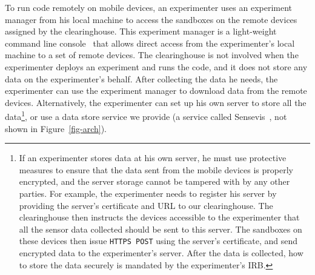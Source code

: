 To run code remotely on mobile devices, an experimenter uses an
experiment manager from his local machine 
to access the sandboxes on the remote devices assigned by the clearinghouse. 
This experiment manager is a light-weight command line 
console~\cite{demo-kit} that allows direct access from the 
experimenter's local machine to a set of remote devices. 
The clearinghouse is not involved when the experimenter deploys 
an experiment and runs the code, and it does not store any
data on the experimenter's behalf. After collecting the data he needs, the
experimenter can use the experiment manager to download data from the remote devices. 
Alternatively, the experimenter can set up his own server to store all 
the data\footnote{\scriptsize
If an experimenter stores data at his own server, he must use protective
measures to ensure that the data sent from the mobile devices is
properly encrypted, and the server storage cannot be tampered
with by any other parties. For example, the experimenter needs to register
his server by providing the server's certificate and URL to our
clearinghouse. The clearinghouse then instructs the devices
accessible to the experimenter that all the sensor data collected should be
sent to this server. The sandboxes on these devices then issue
\texttt{HTTPS POST} using the server's certificate, and send encrypted
data to the experimenter's server. After the data is collected, how to store
the data securely is mandated by the experimenter's IRB.}, or use a data 
store service we provide (a service called Sensevis~\cite{sensevis}, 
not shown in Figure~\ref{fig-arch}).

